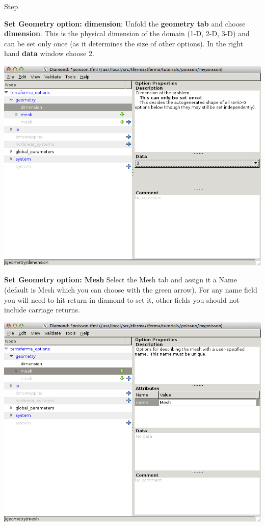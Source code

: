 \begin{steps}{Step}
\item\textbf{ Set Geometry option: dimension}: Unfold the
  \textbf{geometry tab} and choose \textbf{dimension}.  This is the
  physical dimension of the domain (1-D, 2-D, 3-D) and can be set only
  once (as it determines the size of other options).  In the right
  hand \textbf{data} window choose 2.
\begin{center}
  \includegraphics[width=\diamondwidth]{figures/screendumps/diamond_poisson_02a.png}    
  \end{center}

\item \textbf{Set Geometry option: Mesh} Select the Mesh tab and
  assign it a Name (default is Mesh which you can choose with the
  green arrow).  For any name field you will
  need to hit return in diamond to set it,  other fields you should not include
  carriage returns. 
  \begin{center}
    \includegraphics[width=\diamondwidth]{figures/screendumps/diamond_poisson_03a.png}
  \end{center}


\end{steps}

